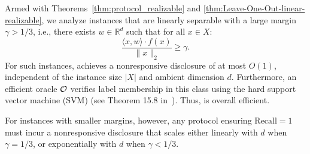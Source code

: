 \begin{corollary}
    Armed with Theorems~\ref{thm:protocol_realizable} and \ref{thm:Leave-One-Out-linear-realizable}, we analyze instances that are linearly separable with a large margin $\gamma > 1/3$, i.e., there exists $w \in \mathbb{R}^d$ such that for all $x \in X$:
\[
\frac{\langle x, w \rangle \cdot f(x)}{\|x\|_2} \geq \gamma.
\]
For such instances,  achieves a nonresponsive disclosure of at most $O(1)$, independent of the instance size $|X|$ and ambient dimension $d$.  
Furthermore, an efficient oracle $\mathcal{O}$ verifies label membership in this class using the hard support vector machine (SVM) (see Theorem 15.8 in~\citet*{shalev2014understanding}). Thus,  is overall efficient.

For instances with smaller margins, however, any protocol ensuring $\mathrm{Recall} = 1$ must incur a nonresponsive disclosure that scales either linearly with $d$ when $\gamma = 1/3$, or exponentially with $d$ when $\gamma < 1/3$.

\end{corollary}



